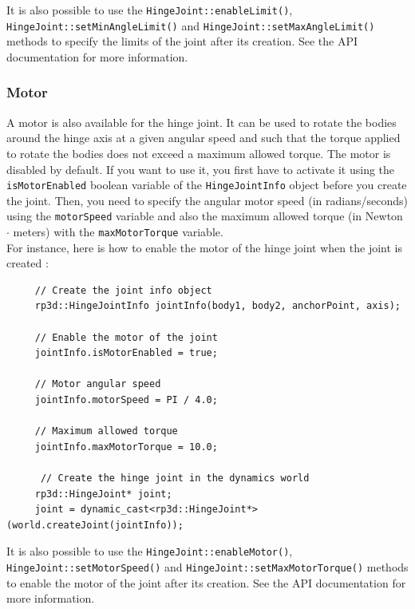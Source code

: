 \documentclass[a4paper,12pt]{article}
\begin{document}
     \begin{sloppypar}
        It is also possible to use the \texttt{HingeJoint::enableLimit()}, \texttt{HingeJoint::setMinAngleLimit()} and \texttt{HingeJoint::setMaxAngleLimit()} methods to specify
        the limits of the joint after its creation. See the API documentation for more information.
     \end{sloppypar}

     \subsubsection{Motor}

     A motor is also available for the hinge joint. It can be used to rotate the bodies around the hinge axis at a given angular speed and such that the torque applied to
     rotate the bodies does not exceed a maximum allowed torque. The motor is disabled by default. If you want to use it, you first have to activate it using the
     \texttt{isMotorEnabled} boolean variable of the \texttt{HingeJointInfo} object before you create the joint. Then, you need to specify the angular motor speed (in radians/seconds)
     using the \texttt{motorSpeed} variable and also the maximum allowed torque (in Newton $\cdot$ meters) with the \texttt{maxMotorTorque} variable. \\

     For instance, here is how to enable the motor of the hinge joint when the joint is created : \\

     \begin{lstlisting}
     // Create the joint info object
     rp3d::HingeJointInfo jointInfo(body1, body2, anchorPoint, axis);

     // Enable the motor of the joint
     jointInfo.isMotorEnabled = true;

     // Motor angular speed
     jointInfo.motorSpeed = PI / 4.0;

     // Maximum allowed torque
     jointInfo.maxMotorTorque = 10.0;

      // Create the hinge joint in the dynamics world
     rp3d::HingeJoint* joint;
     joint = dynamic_cast<rp3d::HingeJoint*>(world.createJoint(jointInfo));
  \end{lstlisting}

     \vspace{0.6cm}

     \begin{sloppypar}
        It is also possible to use the \texttt{HingeJoint::enableMotor()}, \texttt{HingeJoint::setMotorSpeed()} and \texttt{HingeJoint::setMaxMotorTorque()} methods to
        enable the motor of the joint after its creation. See the API documentation for more information.
     \end{sloppypar}
\end{document}
